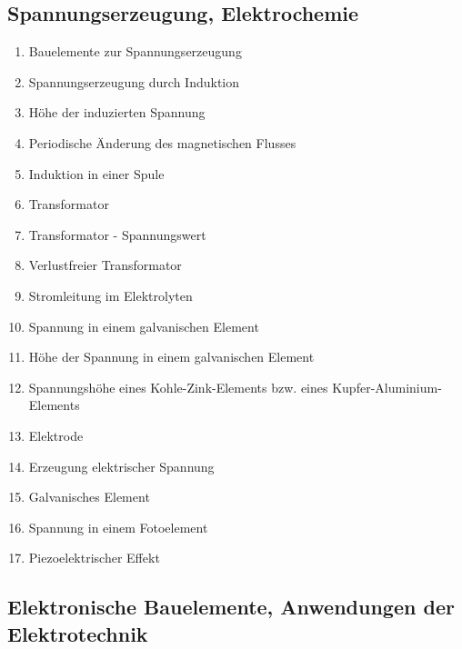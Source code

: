 \subsection{Spannungserzeugung,
Elektrochemie}\label{spannungserzeugung-elektrochemie}

\begin{enumerate}
\item
  Bauelemente zur Spannungserzeugung\\
\item
  Spannungserzeugung durch Induktion\\
\item
  Höhe der induzierten Spannung\\
\item
  Periodische Änderung des magnetischen Flusses\\
\item
  Induktion in einer Spule\\
\item
  Transformator\\
\item
  Transformator - Spannungswert\\
\item
  Verlustfreier Transformator\\
\item
  Stromleitung im Elektrolyten\\
\item
  Spannung in einem galvanischen Element\\
\item
  Höhe der Spannung in einem galvanischen Element\\
\item
  Spannungshöhe eines Kohle-Zink-Elements bzw. eines
  Kupfer-Aluminium-Elements\\
\item
  Elektrode\\
\item
  Erzeugung elektrischer Spannung\\
\item
  Galvanisches Element\\
\item
  Spannung in einem Fotoelement\\
\item
  Piezoelektrischer Effekt
\end{enumerate}

\subsection{Elektronische Bauelemente, Anwendungen der
Elektrotechnik}\label{elektronische-bauelemente-anwendungen-der-elektrotechnik}

